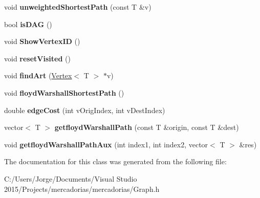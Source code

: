 \begin{DoxyCompactItemize}
\item 
void {\bfseries unweighted\+Shortest\+Path} (const T \&v)\hypertarget{class_graph_ae5264597aacaf4f45819e96a6d6c89aa}{}\label{class_graph_ae5264597aacaf4f45819e96a6d6c89aa}

\item 
bool {\bfseries is\+D\+AG} ()\hypertarget{class_graph_ab49d07c2bd6b8b30d5ae82bc558b821a}{}\label{class_graph_ab49d07c2bd6b8b30d5ae82bc558b821a}

\item 
void {\bfseries Show\+Vertex\+ID} ()\hypertarget{class_graph_aa398a8934013c6ed8fd97dfdd518bc89}{}\label{class_graph_aa398a8934013c6ed8fd97dfdd518bc89}

\item 
void {\bfseries reset\+Visited} ()\hypertarget{class_graph_ada2ab6b203763588b7f9a8e7ad8a2102}{}\label{class_graph_ada2ab6b203763588b7f9a8e7ad8a2102}

\item 
void {\bfseries find\+Art} (\hyperlink{class_vertex}{Vertex}$<$ T $>$ $\ast$v)\hypertarget{class_graph_a449ab830459e22404c2b939e51df3cde}{}\label{class_graph_a449ab830459e22404c2b939e51df3cde}

\item 
void {\bfseries floyd\+Warshall\+Shortest\+Path} ()\hypertarget{class_graph_ae5161f4408bf1ead2b29d19d67fb04ee}{}\label{class_graph_ae5161f4408bf1ead2b29d19d67fb04ee}

\item 
double {\bfseries edge\+Cost} (int v\+Orig\+Index, int v\+Dest\+Index)\hypertarget{class_graph_a15916acb538dbab24c24a13fd4d5d29d}{}\label{class_graph_a15916acb538dbab24c24a13fd4d5d29d}

\item 
vector$<$ T $>$ {\bfseries getfloyd\+Warshall\+Path} (const T \&origin, const T \&dest)\hypertarget{class_graph_ab23d1dae92a7f2b29dcb91a94336674c}{}\label{class_graph_ab23d1dae92a7f2b29dcb91a94336674c}

\item 
void {\bfseries getfloyd\+Warshall\+Path\+Aux} (int index1, int index2, vector$<$ T $>$ \&res)\hypertarget{class_graph_aad1eda4beb8425d03ed1f3b8af397563}{}\label{class_graph_aad1eda4beb8425d03ed1f3b8af397563}

\end{DoxyCompactItemize}


The documentation for this class was generated from the following file\+:\begin{DoxyCompactItemize}
\item 
C\+:/\+Users/\+Jorge/\+Documents/\+Visual Studio 2015/\+Projects/mercadorias/mercadorias/Graph.\+h\end{DoxyCompactItemize}
